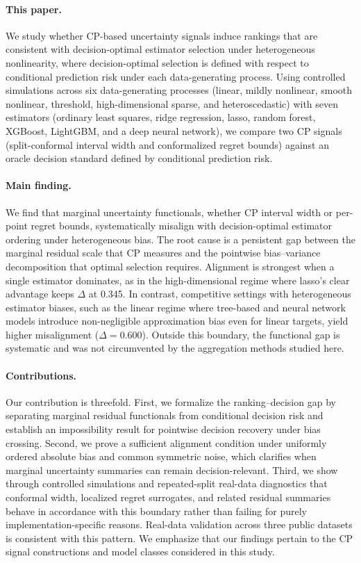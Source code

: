 \documentclass[pdflatex,sn-mathphys-ay]{sn-jnl}%
\theoremstyle{thmstyleone}%
\theoremstyle{thmstyletwo}%
\theoremstyle{thmstylethree}%
\begin{document}
\paragraph{This paper.}
We study whether CP-based uncertainty signals induce rankings that are consistent with decision-optimal estimator selection under heterogeneous nonlinearity, where decision-optimal selection is defined with respect to conditional prediction risk under each data-generating process. Using controlled simulations across six data-generating processes (linear, mildly nonlinear, smooth nonlinear, threshold, high-dimensional sparse, and heteroscedastic) with seven estimators (ordinary least squares, ridge regression, lasso, random forest, XGBoost, LightGBM, and a deep neural network), we compare two CP signals (split-conformal interval width and conformalized regret bounds) against an oracle decision standard defined by conditional prediction risk.

\paragraph{Main finding.}
We find that marginal uncertainty functionals, whether CP interval width or per-point regret bounds, systematically misalign with decision-optimal estimator ordering under heterogeneous bias. The root cause is a persistent gap between the marginal residual scale that CP measures and the pointwise bias--variance decomposition that optimal selection requires. Alignment is strongest when a single estimator dominates, as in the high-dimensional regime where lasso's clear advantage keeps $\Delta$ at 0.345. In contrast, competitive settings with heterogeneous estimator biases, such as the linear regime where tree-based and neural network models introduce non-negligible approximation bias even for linear targets, yield higher misalignment ($\Delta = 0.600$). Outside this boundary, the functional gap is systematic and was not circumvented by the aggregation methods studied here.

\paragraph{Contributions.}
Our contribution is threefold. First, we formalize the ranking--decision gap by separating marginal residual functionals from conditional decision risk and establish an impossibility result for pointwise decision recovery under bias crossing. Second, we prove a sufficient alignment condition under uniformly ordered absolute bias and common symmetric noise, which clarifies when marginal uncertainty summaries can remain decision-relevant. Third, we show through controlled simulations and repeated-split real-data diagnostics that conformal width, localized regret surrogates, and related residual summaries behave in accordance with this boundary rather than failing for purely implementation-specific reasons. Real-data validation across three public datasets is consistent with this pattern. We emphasize that our findings pertain to the CP signal constructions and model classes considered in this study.
\end{document}
